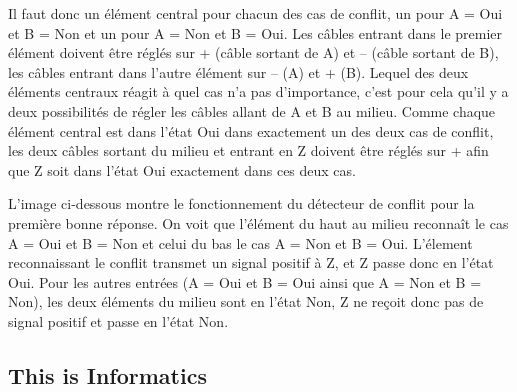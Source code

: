 \documentclass[a4paper,11pt]{report}
\newcommand{\taskGraphicsFolder}{..}
\begin{document}
{\centering%
\par}

Il faut donc un élément central pour chacun des cas de conflit, un pour A = Oui et B = Non et un pour A = Non et B = Oui. Les câbles entrant dans le premier élément doivent être réglés sur + (câble sortant de A) et – (câble sortant de B), les câbles entrant dans l’autre élément sur – (A) et + (B). Lequel des deux éléments centraux réagit à quel cas n’a pas d’importance, c’est pour cela qu’il y a deux possibilités de régler les câbles allant de A et B au milieu. Comme chaque élément central est dans l’état Oui dans exactement un des deux cas de conflit, les deux câbles sortant du milieu et entrant en Z doivent être réglés sur + afin que Z soit dans l’état Oui exactement dans ces deux cas.

L’image ci-dessous montre le fonctionnement du détecteur de conflit pour la première bonne réponse. On voit que l’élément du haut au milieu reconnaît le cas A = Oui et B = Non et celui du bas le cas A = Non et B = Oui. L’élement reconnaissant le conflit transmet un signal positif à Z, et Z passe donc en l’état Oui. Pour les autres entrées (A = Oui et B = Oui ainsi que A = Non et B = Non), les deux éléments du milieu sont en l’état Non, Z ne reçoit donc pas de signal positif et passe en l’état Non.

{\centering%
\raisebox{-0.5ex}{} \raisebox{-0.5ex}{}

\raisebox{-0.5ex}{} \raisebox{-0.5ex}{}\par}


\subsection*{This is Informatics}
\end{document}
